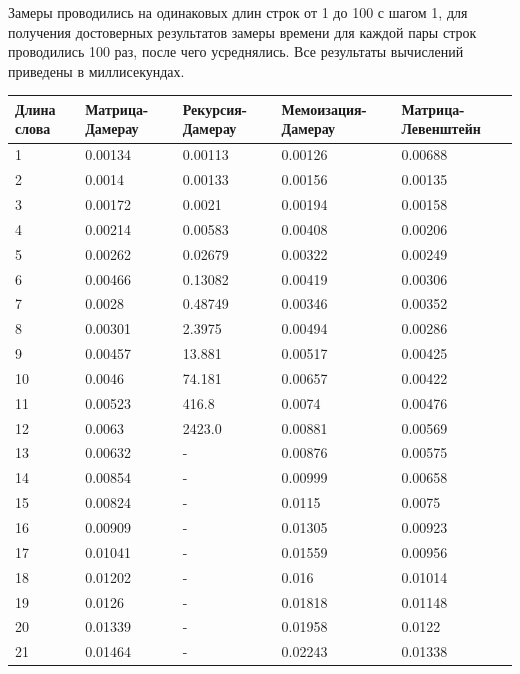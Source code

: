 Замеры проводились на одинаковых длин строк от 1 до 100 с шагом 1, для получения достоверных результатов замеры 
времени для каждой пары строк проводились 100 раз, после чего усреднялись. Все результаты вычислений приведены в миллисекундах.
\begin{table}[!ht]
    \centering
	\label{t:timings}
	\tiny
    \begin{tabular}{|l|l|l|l|l|}
    \hline
        Длина слова & Матрица-Дамерау & Рекурсия-Дамерау & Мемоизация-Дамерау & Матрица-Левенштейн \\ \hline
        1 & 0.00134 & 0.00113 & 0.00126 & 0.00688 \\ \hline
        2 & 0.0014 & 0.00133 & 0.00156 & 0.00135 \\ \hline
        3 & 0.00172 & 0.0021 & 0.00194 & 0.00158 \\ \hline
        4 & 0.00214 & 0.00583 & 0.00408 & 0.00206 \\ \hline
        5 & 0.00262 & 0.02679 & 0.00322 & 0.00249 \\ \hline
        6 & 0.00466 & 0.13082 & 0.00419 & 0.00306 \\ \hline
        7 & 0.0028 & 0.48749 & 0.00346 & 0.00352 \\ \hline
        8 & 0.00301 & 2.3975 & 0.00494 & 0.00286 \\ \hline
        9 & 0.00457 & 13.881 & 0.00517 & 0.00425 \\ \hline
        10 & 0.0046 & 74.181 & 0.00657 & 0.00422 \\ \hline
        11 & 0.00523 & 416.8 & 0.0074 & 0.00476 \\ \hline
        12 & 0.0063 & 2423.0 & 0.00881 & 0.00569 \\ \hline
        13 & 0.00632 & - & 0.00876 & 0.00575 \\ \hline
        14 & 0.00854 & - & 0.00999 & 0.00658 \\ \hline
        15 & 0.00824 & - & 0.0115 & 0.0075 \\ \hline
        16 & 0.00909 & - & 0.01305 & 0.00923 \\ \hline
        17 & 0.01041 & - & 0.01559 & 0.00956 \\ \hline
        18 & 0.01202 & - & 0.016 & 0.01014 \\ \hline
        19 & 0.0126 & - & 0.01818 & 0.01148 \\ \hline
        20 & 0.01339 & - & 0.01958 & 0.0122 \\ \hline
        21 & 0.01464 & - & 0.02243 & 0.01338 \\ \hline

\end{tabular}
\end{table}
